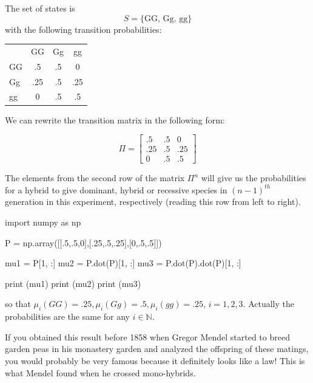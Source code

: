 \cprotEnv\begin{solution}
The set of states is 
\begin{equation*}
S = \{\textrm{GG, Gg, gg}\}
\end{equation*}
with the following transition probabilities:

\begin{table}[htbp]
\centering
\begin{tabular}{l c c c}
&GG& Gg & gg \\
GG & .5 & .5 & 0 \\
Gg & .25 & .5 & .25 \\
gg & 0 & .5 & .5 \\
\end{tabular}
\end{table}
\noindent
We can rewrite the transition matrix in the following form:

\begin{equation*}
\Pi =
\begin{bmatrix}
.5 &.5 &0\\
.25 &.5 &.25\\
0 &.5 &.5
\end{bmatrix}
\end{equation*}

The elements from the second row of the matrix $\Pi^n$ will give us the probabilities for a hybrid to give dominant, hybrid or recessive species in $(n − 1)^{th}$ generation in this experiment, respectively (reading this row from left to right).
\begin{ipython}
import numpy as np

P = np.array([[.5,.5,0],[.25,.5,.25],[0,.5,.5]])

mu1 = P[1, :]
mu2 = P.dot(P)[1, :]
mu3 = P.dot(P).dot(P)[1, :]

print (mu1)
print (mu2)
print (mu3)
\end{ipython}
\begin{ioutput}
[0.25 0.5  0.25]
[0.25 0.5  0.25]
[0.25 0.5  0.25]
\end{ioutput}
so that $\mu_i(GG) = .25, \mu_i(Gg) = .5, \mu_i(gg) = .25$, $i = 1, 2, 3$.
Actually the probabilities are the same for any $i \in \mathbb{N}$. 

\begin{curiosity}
If you obtained this result before 1858 when Gregor Mendel started to breed garden peas in his monastery garden and analyzed the offspring of these matings, you would probably be very famous because it definitely looks like a law! This is what Mendel found when he crossed mono-hybrids.
\end{curiosity}
\end{solution}
